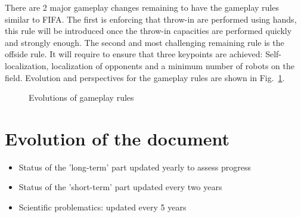 \documentclass{article}
\begin{document}
There are 2 major gameplay changes remaining to have the gameplay rules similar to FIFA.
The first is enforcing that throw-in are performed using hands,
this rule will be introduced once the throw-in capacities are performed quickly and
strongly enough.
The second and most challenging remaining rule is the offside rule.
It will require to ensure that three keypoints are achieved:
Self-localization, localization of opponents and a minimum number of robots on the field.
Evolution and perspectives for the gameplay rules are shown in Fig.~\ref{fig:gameplay_rules}.

\begin{figure}
  \centering
  
  \caption{\label{fig:gameplay_rules}Evolutions of gameplay rules}
\end{figure}


%


\section{Evolution of the document}


\begin{itemize}
\item Status of the 'long-term' part updated yearly to assess progress
\item Status of the 'short-term' part updated every two years
\item Scientific problematics: updated every 5 years
\end{itemize}

\newpage

\printbibliography
\end{document}
